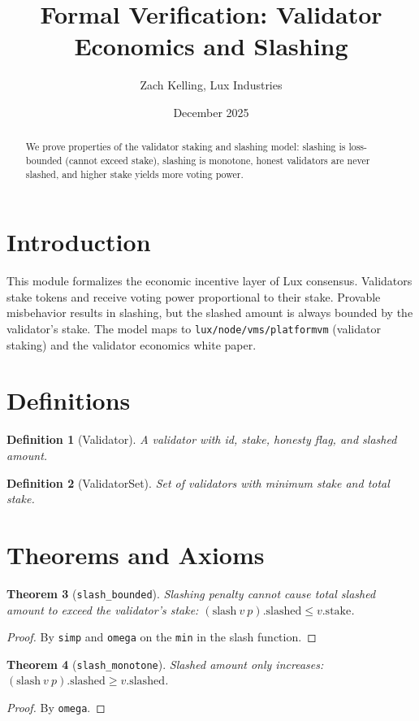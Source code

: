 \documentclass[11pt]{article}
\title{Formal Verification: Validator Economics and Slashing}
\author{Zach Kelling, Lux Industries}
\date{December 2025}
\newtheorem{theorem}{Theorem}
\newtheorem{definition}[theorem]{Definition}
\begin{document}
\maketitle

\begin{abstract}
We prove properties of the validator staking and slashing model: slashing is loss-bounded (cannot exceed stake), slashing is monotone, honest validators are never slashed, and higher stake yields more voting power.
\end{abstract}

\section{Introduction}
This module formalizes the economic incentive layer of Lux consensus. Validators stake tokens and receive voting power proportional to their stake. Provable misbehavior results in slashing, but the slashed amount is always bounded by the validator's stake. The model maps to \texttt{lux/node/vms/platformvm} (validator staking) and the validator economics white paper.

\section{Definitions}
\begin{definition}[Validator]
A validator with id, stake, honesty flag, and slashed amount.
\end{definition}

\begin{definition}[ValidatorSet]
Set of validators with minimum stake and total stake.
\end{definition}


\section{Theorems and Axioms}
\begin{theorem}[\texttt{slash\_bounded}]
Slashing penalty cannot cause total slashed amount to exceed the validator's stake: $(\text{slash}~v~p).\text{slashed} \leq v.\text{stake}$.
\end{theorem}
\begin{proof}
By \texttt{simp} and \texttt{omega} on the \texttt{min} in the slash function.
\end{proof}

\begin{theorem}[\texttt{slash\_monotone}]
Slashed amount only increases: $(\text{slash}~v~p).\text{slashed} \geq v.\text{slashed}$.
\end{theorem}
\begin{proof}
By \texttt{omega}.
\end{proof}
\end{document}
